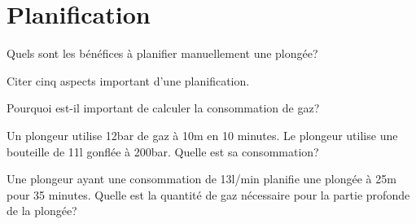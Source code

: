 \documentclass[english,12pt,a4paper]{article}
\begin{document}
	\section{Planification}
	\begin{outline}
		\1 Quels sont les bénéfices à planifier manuellement une plongée?
			\2[] \hspace{-2em}\hrulefill
			\2[] \hspace{-2em}\hrulefill
			\2[] \hspace{-2em}\hrulefill
			\2[] \hspace{-2em}\hrulefill

		\1 Citer cinq aspects important d'une planification.
			\2[] \hspace{-2em}\hrulefill
			\2[] \hspace{-2em}\hrulefill
			\2[] \hspace{-2em}\hrulefill
			\2[] \hspace{-2em}\hrulefill
			\2[] \hspace{-2em}\hrulefill

		\1 Pourquoi est-il important de calculer la consommation de gaz?
			\2[] \hspace{-2em}\hrulefill
			\2[] \hspace{-2em}\hrulefill
			\2[] \hspace{-2em}\hrulefill

		\1 Un plongeur utilise 12bar de gaz à 10m en 10 minutes. Le plongeur utilise une bouteille de 11l gonflée à 200bar. Quelle est sa consommation?
			\2[] \hspace{-2em}\hrulefill
			\2[] \hspace{-2em}\hrulefill
			\2[] \hspace{-2em}\hrulefill
			\2[] \hspace{-2em}\hrulefill

		\1 Une plongeur ayant une consommation de 13l/min planifie une plongée à 25m pour 35 minutes. Quelle est la quantité de gaz nécessaire pour la partie profonde de la plongée?
			\2[] \hspace{-2em}\hrulefill
			\2[] \hspace{-2em}\hrulefill
			\2[] \hspace{-2em}\hrulefill
			\2[] \hspace{-2em}\hrulefill


\end{outline}
\end{document}
